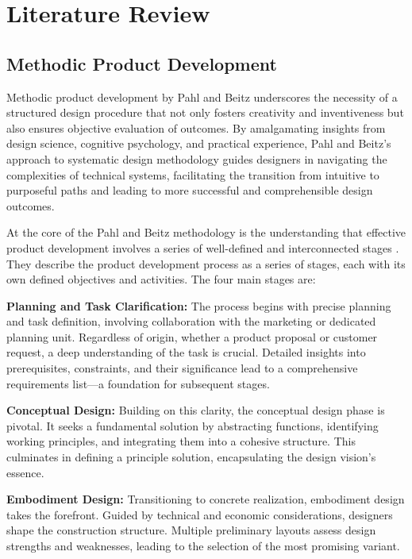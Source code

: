 \chapter{Literature Review}
\label{ch:literaturereview}

\section{Methodic Product Development}
\label{sec:methodicproductdevelopment}

Methodic product development by Pahl and Beitz underscores the necessity of a structured design procedure that not only fosters creativity and inventiveness but also ensures objective evaluation of outcomes. By amalgamating insights from design science, cognitive psychology, and practical experience, Pahl and Beitz's approach to systematic design methodology guides designers in navigating the complexities of technical systems, facilitating the transition from intuitive to purposeful paths and leading to more successful and comprehensible design outcomes. \cite{Pahl07j}

At the core of the Pahl and Beitz methodology is the understanding that effective product development involves a series of well-defined and interconnected stages \cite{Pahl07k}. They describe the product development process as a series of stages, each with its own defined objectives and activities. The four main stages are:

\textbf{Planning and Task Clarification:} The process begins with precise planning and task definition, involving collaboration with the marketing or dedicated planning unit. Regardless of origin, whether a product proposal or customer request, a deep understanding of the task is crucial. Detailed insights into prerequisites, constraints, and their significance lead to a comprehensive requirements list—a foundation for subsequent stages.

\textbf{Conceptual Design:} Building on this clarity, the conceptual design phase is pivotal. It seeks a fundamental solution by abstracting functions, identifying working principles, and integrating them into a cohesive structure. This culminates in defining a principle solution, encapsulating the design vision's essence.

\textbf{Embodiment Design:} Transitioning to concrete realization, embodiment design takes the forefront. Guided by technical and economic considerations, designers shape the construction structure. Multiple preliminary layouts assess design strengths and weaknesses, leading to the selection of the most promising variant.


